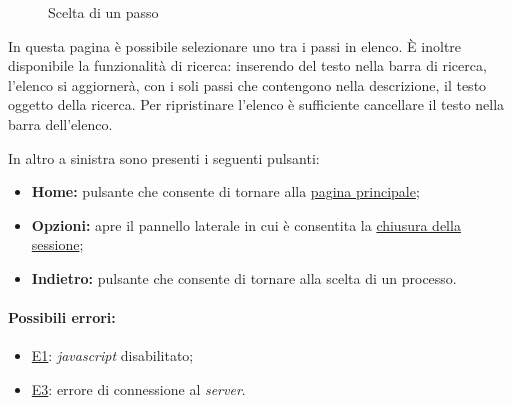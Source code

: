 \begin{figure}[H] \centering 
{} \caption{Scelta di un passo}
\label{fig:Fprocess}
\end{figure}

In questa pagina è possibile selezionare uno tra i passi in elenco. È inoltre disponibile la funzionalità di ricerca: inserendo del testo nella barra di ricerca, l'elenco si aggiornerà, con i soli passi che contengono nella descrizione, il testo oggetto della ricerca.
Per ripristinare l'elenco è sufficiente cancellare il testo nella barra dell'elenco.

In altro a sinistra sono presenti i seguenti pulsanti:
\begin{itemize}
\item \textbf{Home:} pulsante che consente di tornare alla \hyperref[home]{pagina principale};
\item \textbf{Opzioni:} apre il pannello laterale in cui è consentita la \hyperref[logout]{chiusura della sessione};
\item \textbf{Indietro:} pulsante che consente di tornare alla scelta di un processo.
\end{itemize}

\paragraph*{Possibili errori:}
\begin{itemize}
\item \hyperref[e1]{E1}: \textit{javascript} disabilitato;
\item \hyperref[e3]{E3}: errore di connessione al \textit{server}.
\end{itemize}

